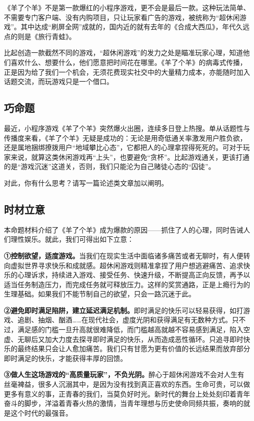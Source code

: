 《羊了个羊》不是第一款爆红的小程序游戏，更不会是最后一款。这种玩法简单、不需要专门客户端、没有内购项目，只让玩家看广告的游戏，被统称为“超休闲游戏”。其中达成“刷屏全网”成就的，国内近的就有去年的《合成大西瓜》，年代久远点的则是《旅行青蛙》。

比起创造一款截然不同的游戏，“超休闲游戏”的发力之处是瞄准玩家心理，知道他们喜欢什么、想要什么，他们愿意把时间花在哪里。《羊了个羊》的病毒式传播，正是因为给了我们一个机会，无须花费现实社交中的大量精力成本，亦能随时加入话题交流，而玩游戏只是一个借口。

\subsection*{巧命题}

最近，小程序游戏《羊了个羊》突然爆火出圈，连续多日登上热搜。单从话题性与传播度来看，《羊了个羊》无疑是成功的：无论是用奇低通关率激发用户胜负欲，还是属地捆绑撩拨用户“地域攀比心态”，它都把人的心理拿捏得死死的。可对于玩家来说，就算这类休闲游戏再“上头”，也要避免“贪杯”。比起游戏通关，更该打通的是“游戏沉迷”这道关，否则，我们只能沦为自己赌徒心态的“囚徒”。

对此，你有什么思考？请写一篇论述类文章加以阐明。

\subsection*{时材立意}

本命题材料介绍了《羊了个羊》成为爆款的原因——抓住了人的心理，同时告诫人们理性娱乐。就此，我们可得出如下立意：

\textbf{①控制欲望，适度游戏。}当我们在现实生活中面临诸多痛苦或者无聊时，有人便转向虚拟世界寻求快乐和成就感。超休闲游戏则精准拿捏了用户想逃避痛苦、追求快乐的心理诉求，持续进入游戏、接受任务、快速升级，不断提高正向反馈，再予以适当任务制造压力，而完成任务就可释放压力。这样的奖赏通路，正是上瘾行为的生理基础。如果我们不能节制自己的欲望，只会一路沉迷于此。

\textbf{②避免即时满足陷阱，建立延迟满足机制。}即时满足的快乐可以轻易获得，如打游戏、追剧、抽烟、酗酒……在现代社会，虚度光阴和获得满足有无数种方式。只不过，满足感的门槛一旦升高就很难降低，而门槛越高就越不容易感到满足，陷入空虚、无聊后又加大力度去探寻即时满足的快乐，从而造成恶性循环。只追寻即时快乐的最终结果只会让人愈加痛苦。我们只有甘愿为更有价值的长远结果而放弃部分即时满足的快乐，才能获得丰厚的回馈。

\textbf{③做人生这场游戏的“高质量玩家”，不负光阴。}醉心于超休闲游戏不会对人生有丝毫裨益，很多人沉溺其中，是因为没有找到真正喜欢的东西。生命可贵，可以做更多有意义的事，正青春的我们，当莫负好时光。新时代的舞台上处处刻印着青年奋斗的脚步，洋溢着青春火热的激情，当青年理想与历史使命同频共振，奏响的就是这个时代的最强音。

